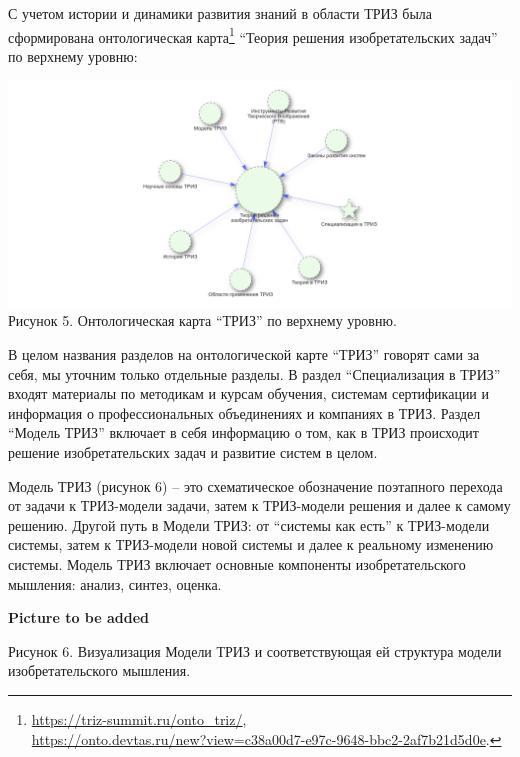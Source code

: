 \documentclass[11pt,a4paper]{article}
\newcommand{\addpicture}{\textbf{Picture to be added}\par}
\begin{document}
С учетом истории и динамики развития знаний в области ТРИЗ была сформирована
онтологическая карта\footnote{\url{https://triz-summit.ru/onto_triz/},\\
  \url{https://onto.devtas.ru/new?view=c38a00d7-e97c-9648-bbc2-2af7b21d5d0e}. }
“Теория решения изобретательских задач” по верхнему уровню:
\begin{center}
  \includegraphics[width=.8\textwidth]{5.png}\\
  Рисунок 5. Онтологическая карта “ТРИЗ” по верхнему уровню.
\end{center}
В целом названия разделов на онтологической карте “ТРИЗ” говорят сами за себя,
мы уточним только отдельные разделы. В раздел “Специализация в ТРИЗ” входят
материалы по методикам и курсам обучения, системам сертификации и информация о
профессиональных объединениях и компаниях в ТРИЗ. Раздел “Модель ТРИЗ”
включает в себя информацию о том, как в ТРИЗ происходит решение
изобретательских задач и развитие систем в целом.

Модель ТРИЗ (рисунок 6) – это схематическое обозначение поэтапного перехода от
задачи к ТРИЗ-модели задачи, затем к ТРИЗ-модели решения и далее к самому
решению. Другой путь в Модели ТРИЗ: от “системы как есть” к ТРИЗ-модели
системы, затем к ТРИЗ-модели новой системы и далее к реальному изменению
системы.  Модель ТРИЗ включает основные компоненты изобретательского мышления:
анализ, синтез, оценка.

\begin{center}
  \addpicture
  Рисунок 6. Визуализация Модели ТРИЗ и соответствующая ей структура модели
  изобретательского мышления.
\end{center}
\end{document}
